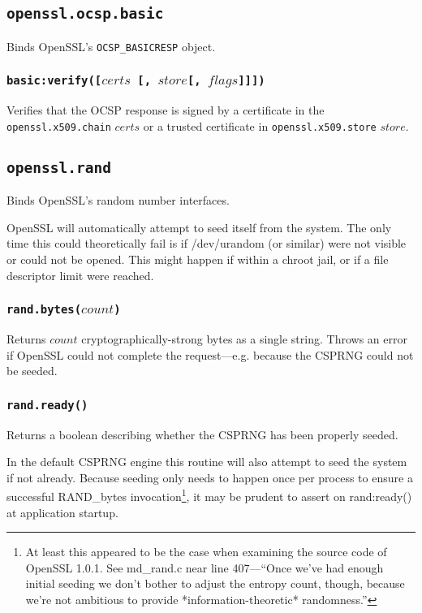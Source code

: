 \documentclass[11pt, oneside]{memoir}
\newcommand*{\fn}[1]{\texttt{#1}\xspace}
\newcommand*{\module}[1]{\texttt{#1}\xspace}
\newcounter{toccols}
\newenvironment{Module}[1]{
	\subsection{\texttt{#1}}
	\addtocontents{toc}{
		\protect\begin{multicols}{\value{toccols}}
	}
}{
	\addtocontents{toc}{\protect\end{multicols}}
}
\begin{document}
\begin{Module}{openssl.ocsp.basic}

Binds OpenSSL's \texttt{OCSP\_BASICRESP} object.

\subsubsection[\fn{basic:verify}]{\fn{basic:verify([$certs$ [, $store$[, $flags$]]])}}

Verifies that the OCSP response is signed by a certificate in the \module{openssl.x509.chain} $certs$ or a trusted certificate in \module{openssl.x509.store} $store$.

\end{Module}


\begin{Module}{openssl.rand}

Binds OpenSSL's random number interfaces.

OpenSSL will automatically attempt to seed itself from the system. The only time this could theoretically fail is if /dev/urandom (or similar) were not visible or could not be opened. This might happen if within a chroot jail, or if a file descriptor limit were reached.

\subsubsection[\fn{rand.bytes}]{\fn{rand.bytes($count$)}}

Returns $count$ cryptographically-strong bytes as a single string. Throws an error if OpenSSL could  not complete the request---e.g. because the CSPRNG could not be seeded.

\subsubsection[\fn{rand.ready}]{\fn{rand.ready()}}

Returns a boolean describing whether the CSPRNG has been properly seeded.

In the default CSPRNG engine this routine will also attempt to seed the system if not already. Because seeding only needs to happen once per process to ensure a successful RAND\_bytes invocation\footnote{At least this appeared to be the case when examining the source code of OpenSSL 1.0.1. See md\_rand.c near line 407---``Once we've had enough initial seeding we don't bother to adjust the entropy count, though, because we're not ambitious to provide *information-theoretic* randomness.''}, it may be prudent to assert on rand:ready() at application startup.


\end{Module}
\end{document}
